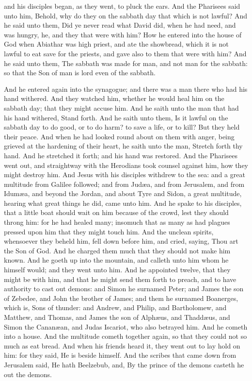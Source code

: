 and his disciples began, as they went, to pluck the ears. And the Pharisees said unto him, Behold, why do they on the sabbath day that which is not lawful? And he said unto them, Did ye never read what David did, when he had need, and was hungry, he, and they that were with him? How he entered into the house of God when Abiathar was high priest, and ate the showbread, which it is not lawful to eat save for the priests, and gave also to them that were with him? And he said unto them, The sabbath was made for man, and not man for the sabbath: so that the Son of man is lord even of the sabbath. 

And he entered again into the synagogue; and there was a man there who had his hand withered. And they watched him, whether he would heal him on the sabbath day; that they might accuse him. And he saith unto the man that had his hand withered, Stand forth. And he saith unto them, Is it lawful on the sabbath day to do good, or to do harm? to save a life, or to kill? But they held their peace. And when he had looked round about on them with anger, being grieved at the hardening of their heart, he saith unto the man, Stretch forth thy hand. And he stretched it forth; and his hand was restored. And the Pharisees went out, and straightway with the Herodians took counsel against him, how they might destroy him.  And Jesus with his disciples withdrew to the sea: and a great multitude from Galilee followed; and from Judæa, and from Jerusalem, and from Idumæa, and beyond the Jordan, and about Tyre and Sidon, a great multitude, hearing what great things he did, came unto him. And he spake to his disciples, that a little boat should wait on him because of the crowd, lest they should throng him: for he had healed many; insomuch that as many as had plagues pressed upon him that they might touch him. And the unclean spirits, whensoever they beheld him, fell down before him, and cried, saying, Thou art the Son of God. And he charged them much that they should not make him known.  And he goeth up into the mountain, and calleth unto him whom he himself would; and they went unto him. And he appointed twelve, that they might be with him, and that he might send them forth to preach, and to have authority to cast out demons: and Simon he surnamed Peter; and James the son of Zebedee, and John the brother of James; and them he surnamed Boanerges, which is, Sons of thunder: and Andrew, and Philip, and Bartholomew, and Matthew, and Thomas, and James the son of Alphæus, and Thaddæus, and Simon the Cananæan, and Judas Iscariot, who also betrayed him. And he cometh into a house. And the multitude cometh together again, so that they could not so much as eat bread. And when his friends heard it, they went out to lay hold on him: for they said, He is beside himself. And the scribes that came down from Jerusalem said, He hath Beelzebub, and, By the prince of the demons casteth he out the demons. 